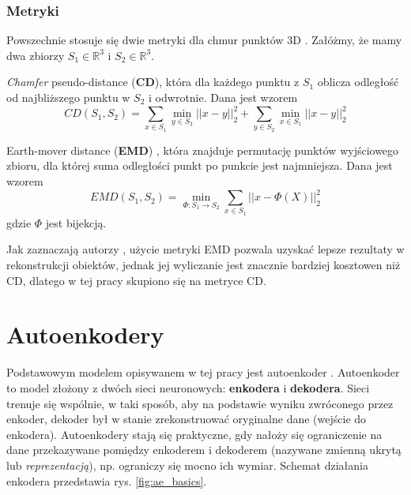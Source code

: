 \documentclass{iithesis}
\begin{document}
\subsubsection{Metryki}
Powszechnie stosuje się dwie metryki dla chmur punktów 3D \cite{metrics}. Załóżmy, że mamy dwa zbiorzy
$S_1 \in \mathbb{R}^3$ i $S_2 \in \mathbb{R}^3$.

\textit{Chamfer} pseudo-distance (\textbf{CD}), która dla każdego punktu z $S_1$ oblicza
odległość od najbliższego punktu w $S_2$ i odwrotnie. Dana jest wzorem
\begin{equation} \label{eq:chamfer_intro}
CD(S_1, S_2) = \sum_{x \in S_1} \min_{y \in S_2} ||x-y||_2^2 + \sum_{y \in S_2} \min_{x \in S_1} ||x-y||_2^2
\end{equation}

Earth-mover distance (\textbf{EMD}) \cite{emd}, która znajduje permutację punktów wyjściowego zbioru,
dla której suma odległości punkt po punkcie jest najmniejsza. Dana jest wzorem
\begin{equation}
EMD(S_1, S_2) = \min_{\Phi:S_1 \rightarrow S_2} \sum_{x \in S_1} ||x-\Phi(X)||_2^2
\end{equation}
gdzie $\Phi$ jest bijekcją.

Jak zaznaczają autorzy \cite{pc_representations}, użycie metryki EMD pozwala uzyskać lepsze rezultaty
w rekonstrukcji obiektów, jednak jej wyliczanie jest znacznie bardziej kosztowen niż CD, dlatego
w tej pracy skupiono się na metryce CD.

\section{Autoenkodery}
Podstawowym modelem opisywanem w tej pracy jest autoenkoder \cite{autoencoders}. Autoenkoder to model
złożony z dwóch sieci neuronowych: \textbf{enkodera} i \textbf{dekodera}. Sieci trenuje
się wspólnie, w taki sposób, aby na podstawie wyniku zwróconego przez enkoder, dekoder był w stanie
zrekonstruować oryginalne dane (wejście do enkodera). Autoenkodery stają się praktyczne, gdy
nałoży się ograniczenie na dane przekazywane pomiędzy enkoderem i dekoderem
(nazywane zmienną ukrytą lub \textit{reprezentacją}),
np. ograniczy się mocno ich wymiar. Schemat działania enkodera przedstawia rys. \ref{fig:ae_basics}.
\end{document}
